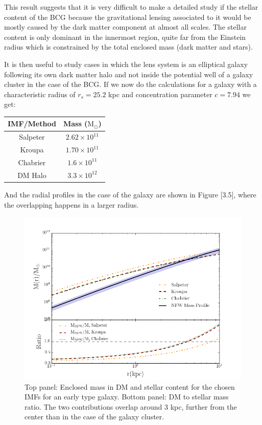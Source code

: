 This result suggests that it is very difficult to make a detailed study if the stellar content of the BCG because the gravitational lensing associated to it would be mostly caused by the dark matter component at almost all scales. The stellar content is only dominant in the innermost region, quite far from the Einstein radius which is constrained by the total enclosed mass (dark matter and stars).

It is then useful to study cases in which the lens system is an elliptical galaxy following its own dark matter halo and not inside the potential well of a galaxy cluster in the case of the BCG. If we now do the calculations for a galaxy with a characteristic radius of $r_s=25.2$ kpc and concentration parameter $c=7.94$ we get:

\begin{center}
\begin{tabular}{c c}
IMF/Method & Mass ($\text{M}_{\odot}$)\tabularnewline
\hline 
\hline
Salpeter & $2.62\times10^{11}$\tabularnewline
Kroupa & $1.70\times10^{11}$\tabularnewline
Chabrier & $1.6\times10^{11}$\tabularnewline
DM Halo & $3.3\times10^{12}$\tabularnewline
\end{tabular}
\end{center}

And the radial profiles in the case of the galaxy are shown in Figure [3.5], where the overlapping happens in a larger radius.

\begin{figure}[H]
\centering
\includegraphics[width=12cm]{images/DM_fraction_all_IMFs_galaxy.png}
\caption[DM and Stellar mass profiles for a massive early type galaxy.]{Top panel: Enclosed mass in DM and stellar content for the chosen IMFs for an early type galaxy. Bottom panel: DM to stellar mass ratio. The two contributions overlap around 3 kpc, further from the center than in the case of the galaxy cluster.}
\end{figure}

